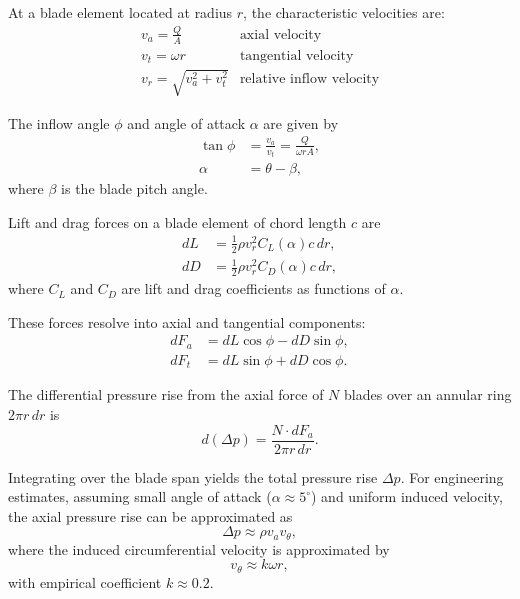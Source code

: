 At a blade element located at radius \( r \), the characteristic velocities are:
\[
\begin{array}{ll}
    v_a = \frac{Q}{A}  & \text{axial velocity} \\
    v_t = \omega r     & \text{tangential velocity} \\
    v_r = \sqrt{v_a^2 + v_t^2} & \text{relative inflow velocity}
\end{array}
\]

The inflow angle \( \phi \) and angle of attack \( \alpha \) are given by
\begin{align}
    \tan \phi &= \frac{v_a}{v_t} = \frac{Q}{\omega r A}, \\
    \alpha &= \theta - \beta,
\end{align}
where \( \beta \) is the blade pitch angle.

Lift and drag forces on a blade element of chord length \( c \) are
\begin{align}
    dL &= \frac{1}{2} \rho v_r^2 C_L(\alpha) c \, dr, \\
    dD &= \frac{1}{2} \rho v_r^2 C_D(\alpha) c \, dr,
\end{align}
where \( C_L \) and \( C_D \) are lift and drag coefficients as functions of \( \alpha \).

These forces resolve into axial and tangential components:
\begin{align}
    dF_a &= dL \cos \phi - dD \sin \phi, \\
    dF_t &= dL \sin \phi + dD \cos \phi.
\end{align}

The differential pressure rise from the axial force of \( N \) blades over an annular ring \( 2 \pi r \, dr \) is
\begin{equation}
    d(\Delta p) = \frac{N \cdot dF_a}{2 \pi r \, dr}.
\end{equation}

Integrating over the blade span yields the total pressure rise \( \Delta p \). For engineering estimates, assuming small angle of attack (\( \alpha \approx 5^\circ \)) and uniform induced velocity, the axial pressure rise can be approximated as
\begin{equation}
    \Delta p \approx \rho v_a v_\theta,
\end{equation}
where the induced circumferential velocity is approximated by
\begin{equation}
    v_\theta \approx k \omega r,
\end{equation}
with empirical coefficient \( k \approx 0.2 \).


